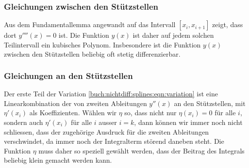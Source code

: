 %
%
\subsubsection{Gleichungen zwischen den Stützstellen}
Aus dem Fundamentallemma angewandt auf das Intervall $[x_i,x_{i+1}]$
zeigt, dass dort $y''''(x)=0$ ist.
Die Funktion $y(x)$ ist daher auf jedem solchen Teilintervall ein
kubisches Polynom.
Insbesondere ist die Funktion $y(x)$ zwischen den Stützstellen 
beliebig oft stetig differenzierbar.

%
%
\subsubsection{Gleichungen an den Stützstellen}
Der erste Teil der Variation 
\eqref{buch:nichtdiff:splines:eqn:variation}
ist eine Linearkombination der von zweiten Ableitungen $y''(x)$ an
den Stützstellen, mit $\eta'(x_i)$ als Koeffizienten.
Wählen wir $\eta$ so, dass nicht nur $\eta(x_i)=0$ für alle $i$,
sondern auch $\eta'(x_i)$ für alle $i$ ausser $i=k$, dann können
wir immer noch nicht schliessen, dass der zugehörige Ausdruck für
die zweiten Ableitungen verschwindet, da immer noch der Integralterm
störend daneben steht.
Die Funktion $\eta$ muss daher so speziell gewählt werden, dass
der Beitrag des Integrals beliebig klein gemacht werden kann.

